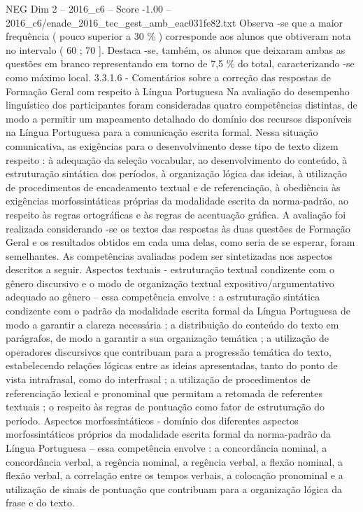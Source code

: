 \begin{textsample}{NEG Dim 2 – 2016\_c6 – Score -1.00 – 2016\_c6/enade\_2016\_tec\_gest\_amb\_eac031fe82.txt}
Observa -se que a maior frequência ( pouco superior a 30 \% ) corresponde aos alunos que obtiveram nota no intervalo ( 60 ; 70 ].
Destaca -se, também, os alunos que deixaram ambas as questões em branco representando em torno de 7,5 \% do total, caracterizando -se como máximo local. 3.3.1.6 - Comentários sobre a correção das respostas de Formação Geral com respeito à Língua Portuguesa Na avaliação do desempenho linguístico dos participantes foram consideradas quatro competências distintas, de modo a permitir um mapeamento detalhado do domínio dos recursos disponíveis na Língua Portuguesa para a comunicação escrita formal.
Nessa situação comunicativa, as exigências para o desenvolvimento desse tipo de texto dizem respeito : à adequação da seleção vocabular, ao desenvolvimento do conteúdo, à estruturação sintática dos períodos, à organização lógica das ideias, à utilização de procedimentos de encadeamento textual e de referenciação, à obediência às exigências morfossintáticas próprias da modalidade escrita da norma-padrão, ao respeito às regras ortográficas e às regras de acentuação gráfica.
A avaliação foi realizada considerando -se os textos das respostas às duas questões de Formação Geral e os resultados obtidos em cada uma delas, como seria de se esperar, foram semelhantes.
As competências avaliadas podem ser sintetizadas nos aspectos descritos a seguir.
Aspectos textuais - estruturação textual condizente com o gênero discursivo e o modo de organização textual expositivo/argumentativo adequado ao gênero – essa competência envolve : a estruturação sintática condizente com o padrão da modalidade escrita formal da Língua Portuguesa de modo a garantir a clareza necessária ; a distribuição do conteúdo do texto em parágrafos, de modo a garantir a sua organização temática ; a utilização de operadores discursivos que contribuam para a progressão temática do texto, estabelecendo relações lógicas entre as ideias apresentadas, tanto do ponto de vista intrafrasal, como do interfrasal ; a utilização de procedimentos de referenciação lexical e pronominal que permitam a retomada de referentes textuais ; o respeito às regras de pontuação como fator de estruturação do período.
Aspectos morfossintáticos - domínio dos diferentes aspectos morfossintáticos próprios da modalidade escrita formal da norma-padrão da Língua Portuguesa – essa competência envolve : a concordância nominal, a concordância verbal, a regência nominal, a regência verbal, a flexão nominal, a flexão verbal, a correlação entre os tempos verbais, a colocação pronominal e a utilização de sinais de pontuação que contribuam para a organização lógica da frase e do texto.

\end{textsample}
